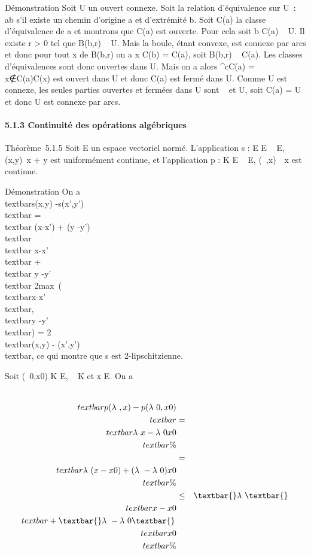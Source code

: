 Démonstration Soit U un ouvert connexe. Soit  la relation d'équivalence
sur U~: ab s'il existe un chemin d'origine a et d'extrémité b. Soit
C(a) la classe d'équivalence de a et montrons que C(a) est ouverte. Pour
cela soit b \in C(a) \subset~ U. Il existe r \textgreater{} 0 tel que B(b,r) \subset~ U.
Mais la boule, étant convexe, est connexe par arcs et donc pour tout x
de B(b,r) on a x \in C(b) = C(a), soit B(b,r) \subset~ C(a). Les classes
d'équivalences sont donc ouvertes dans U. Mais on a alors
^cC(a) =\ \⋃
 x∉C(a)C(x) est ouvert dans U et
donc C(a) est fermé dans U. Comme U est connexe, les seules parties
ouvertes et fermées dans U sont \varnothing~ et U, soit C(a) = U et donc U est
connexe par arcs.

\paragraph{5.1.3 Continuité des opérations algébriques}

Théorème~5.1.5 Soit E un espace vectoriel normé. L'application s : E \times E
\rightarrow~ E, (x,y)\mapsto~x + y est uniformément continue,
et l'application p : K \times E \rightarrow~ E, (\lambda~,x)\mapsto~\lambda~x est
continue.

Démonstration On a \\textbar{}s(x,y)
-s(x',y')\\textbar{} =\\textbar{} (x-x') +
(y -y')\\textbar{} \leq\\textbar{}
x-x'\\textbar{} +\\textbar{} y
-y'\\textbar{} \leq
2max~(\\textbar{}x-x'\\textbar{},\\textbar{}y
-y'\\textbar{}) = 2\\textbar{}(x,y) -
(x',y')\\textbar{}, ce qui montre que s est
2-lipschitzienne.

Soit (\lambda~0,x0) \in K \times E, \lambda~ \in K et x \in E. On a

\begin{align*} \\textbar{}p(\lambda~,x) -
p(\lambda~0,x0)\\textbar{}& =&
\\textbar{}\lambda~x -
\lambda~0x0\\textbar{} \%&
\\ & =& \\textbar{}\lambda~(x -
x0) + (\lambda~ -
\lambda~0)x0\\textbar{}\%&
\\ & \leq&
\textbar{}\lambda~\textbar{}\,\\textbar{}x -
x0\\textbar{} + \textbar{}\lambda~ -
\lambda~0\textbar{}\,\\textbar{}x0\\textbar{}
\%& \\ \end{align*}

